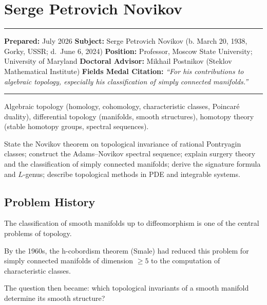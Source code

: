 \chapter{Serge Petrovich Novikov}\label{ch1970sergenovikov:serge-petrovich-novikov-fields-medal-1970-a-comprehensive-report-on-his-work-and-impact}

\begin{center}\rule{0.5\linewidth}{0.5pt}\end{center}

\textbf{Prepared:} July 2026
\textbf{Subject:} Serge Petrovich Novikov (b. March 20, 1938, Gorky, USSR; d.~June 6, 2024)
\textbf{Position:} Professor, Moscow State University; University of Maryland
\textbf{Doctoral Advisor:} Mikhail Postnikov (Steklov Mathematical Institute)
\textbf{Fields Medal Citation:} \emph{``For his contributions to algebraic topology, especially his classification of simply connected manifolds.''}

\begin{center}\rule{0.5\linewidth}{0.5pt}\end{center}

\begin{prereqs}
Algebraic topology (homology, cohomology, characteristic classes, Poincaré duality), differential topology (manifolds, smooth structures), homotopy theory (stable homotopy groups, spectral sequences).
\end{prereqs}

\begin{objectives}
State the Novikov theorem on topological invariance of rational Pontryagin classes; construct the Adams--Novikov spectral sequence; explain surgery theory and the classification of simply connected manifolds; derive the signature formula and $L$-genus; describe topological methods in PDE and integrable systems.
\end{objectives}

\section{Problem History}

The classification of smooth manifolds up to diffeomorphism is one of the central problems of topology.

By the 1960s, the h-cobordism theorem (Smale) had reduced this problem for simply connected manifolds of dimension $\geq 5$ to the computation of characteristic classes.

The question then became: which topological invariants of a smooth manifold determine its smooth structure?

